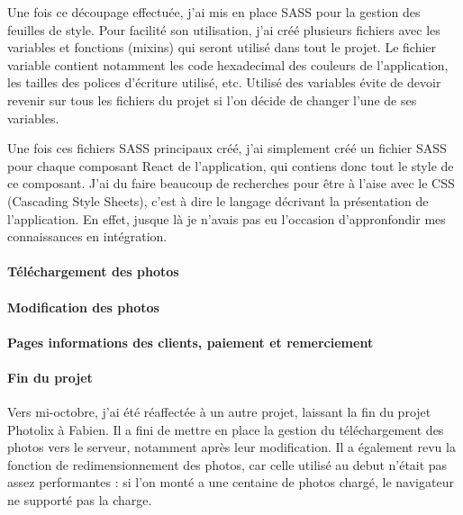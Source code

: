 \documentclass[12pt,a4paper]{article}
\begin{document}
  \bigskip

  Une fois ce découpage effectuée, j'ai mis en place SASS pour la gestion
  des feuilles de style. Pour facilité son utilisation, j'ai créé
  plusieurs fichiers avec les variables et fonctions (mixins) qui seront
  utilisé dans tout le projet. Le fichier variable contient notamment les
  code hexadecimal des couleurs de l'application, les tailles des polices
  d'écriture utilisé, etc. Utilisé des variables évite de devoir revenir
  sur tous les fichiers du projet si l'on décide de changer l'une de ses
  variables.

  \bigskip

  Une fois ces fichiers SASS principaux créé, j'ai simplement créé un
  fichier SASS pour chaque composant React de l'application, qui contiens
  donc tout le style de ce composant. J'ai du faire beaucoup de recherches
  pour être à l'aise avec le CSS (Cascading Style Sheets), c'est à dire le
  langage décrivant la présentation de l'application. En effet, jusque là
  je n'avais pas eu l'occasion d'appronfondir mes connaissances en
  intégration.

  \paragraph{Téléchargement des
  photos}\label{tuxe9luxe9chargement-des-photos}

  \bigskip

  \paragraph{Modification des photos}\label{modification-des-photos}

  \bigskip

  \paragraph{Pages informations des clients, paiement et
  remerciement}\label{pages-informations-des-clients-paiement-et-remerciement}

  \bigskip

  \paragraph{Fin du projet}\label{fin-du-projet}

  \bigskip

  Vers mi-octobre, j'ai été réaffectée à un autre projet, laissant la fin
  du projet Photolix à Fabien. Il a fini de mettre en place la gestion du
  téléchargement des photos vers le serveur, notamment après leur
  modification. Il a également revu la fonction de redimensionnement des
  photos, car celle utilisé au debut n'était pas assez performantes : si
  l'on monté a une centaine de photos chargé, le navigateur ne supporté
  pas la charge.
\end{document}
